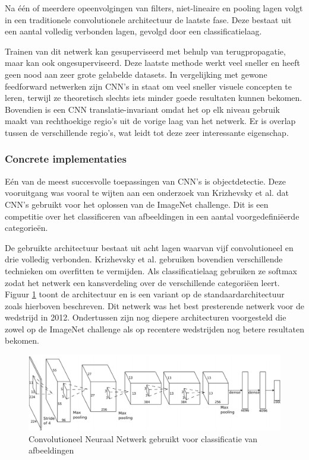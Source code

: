 Na \'e\'en of meerdere opeenvolgingen van filters, niet-lineaire en pooling lagen volgt in een traditionele convolutionele architectuur de laatste fase. Deze bestaat uit een aantal volledig verbonden lagen, gevolgd door een classificatielaag.

Trainen van dit netwerk kan gesuperviseerd met behulp van terugpropagatie, maar kan ook ongesuperviseerd. Deze laatste methode werkt veel sneller en heeft geen nood aan zeer grote gelabelde datasets. 
In vergelijking met gewone feedforward netwerken zijn CNN's in staat om veel sneller visuele concepten te leren, terwijl ze theoretisch slechts iets minder goede resultaten kunnen bekomen.
Bovendien is een CNN translatie-invariant omdat het op elk niveau gebruik maakt van rechthoekige regio's uit de vorige laag van het netwerk. Er is overlap tussen de verschillende regio's, wat leidt tot deze zeer interessante eigenschap.

\subsubsection[]{Concrete implementaties}
E\'en van de meest succesvolle toepassingen van CNN's is objectdetectie. Deze vooruitgang was vooral te wijten aan een onderzoek van Krizhevsky et al.\cite{Krizhevsky2012a} dat CNN's gebruikt voor het oplossen van de ImageNet challenge\cite{Russakovsky2014}.
Dit is een competitie over het classificeren van afbeeldingen in een aantal voorgedefini\"eerde categorie\"en. 

De gebruikte architectuur bestaat uit acht lagen waarvan vijf convolutioneel en drie volledig verbonden. Krizhevsky et al. gebruiken bovendien verschillende technieken om overfitten te vermijden. Als classificatielaag gebruiken ze softmax zodat het netwerk een kansverdeling over de verschillende categori\"een leert. Figuur \ref{fig:AlexNet} toont de architectuur en  is een variant op de standaardarchitectuur zoals hierboven beschreven. Dit netwerk was het best presterende netwerk voor de wedstrijd in 2012. Ondertussen zijn nog diepere architecturen voorgesteld die zowel op de ImageNet challenge als op recentere wedstrijden nog betere resultaten bekomen.

\begin{figure}[tb]
	\centering
	\includegraphics[width=\linewidth]{Images/cnn.PNG}
	\caption{Convolutioneel Neuraal Netwerk gebruikt voor classificatie van afbeeldingen\cite{Krizhevsky2012a}}
	\label{fig:AlexNet}
\end{figure}

